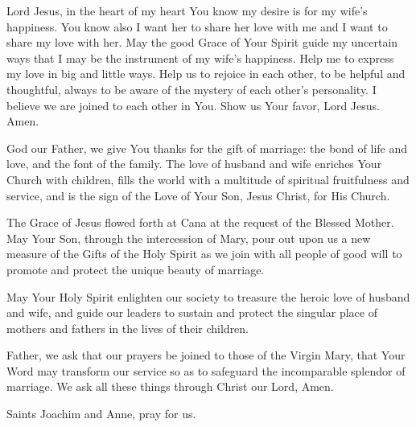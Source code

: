 Lord Jesus, in the heart of my heart You know my desire is for my wife's happiness.
You know also I want her to share her love with me and I want to share my love with her.
May the good Grace of Your Spirit guide my uncertain ways that I may be the instrument of my wife's happiness.
Help me to express my love in big and little ways.
Help us to rejoice in each other, to be helpful and thoughtful, always to be aware of the mystery of each other's personality.
I believe we are joined to each other in You.
Show us Your favor, Lord Jesus.
Amen.

\label{prayer:defense_marriage}
God our Father, we give You thanks for the gift of marriage:
the bond of life and love, and the font of the family. 
The love of husband and wife enriches Your Church with children, fills the world with a multitude of spiritual fruitfulness and service,
and is the sign of the Love of Your Son, Jesus Christ, for His Church.

The Grace of Jesus flowed forth at Cana at the request of the Blessed Mother.
May Your Son, through the intercession of Mary, pour out upon us a new measure of the Gifts of the Holy Spirit as we join with all people of good will to promote and protect the unique beauty of marriage.

May Your Holy Spirit enlighten our society to treasure the heroic love of husband and wife, and guide our leaders to sustain and protect
the singular place of mothers and fathers in the lives of their children.

Father, we ask that our prayers be joined to those of the Virgin Mary, that Your Word may transform our service so as to safeguard the incomparable splendor of marriage.
We ask all these things through Christ our Lord,
Amen.

Saints Joachim and Anne, pray for us.


\newpage